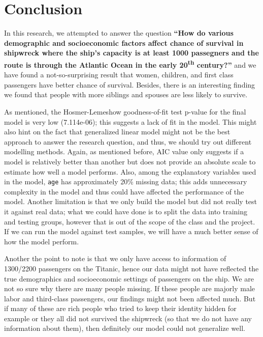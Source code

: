 \documentclass[12pt, oneside]{book}
\theoremstyle{definition}
\theoremstyle{definition}
\theoremstyle{definition}
\theoremstyle{remark}
\begin{document}
\hypertarget{conclusion}{%
\chapter{Conclusion}\label{conclusion}}

In this research, we attempted to answer the question \textbf{``How do
various demographic and socioeconomic factors affect chance of survival
in shipwreck where the ship's capacity is at least 1000 passegners and
the route is through the Atlantic Ocean in the early
20\textsuperscript{th} century?''} and we have found a not-so-surprising
result that women, children, and first class passengers have better
chance of survival. Besides, there is an interesting finding we found
that people with more siblings and spouses are less likely to survive.

As mentioned, the Hosmer-Lemeshow goodness-of-fit test p-value for the
final model is very low (7.114e-06); this suggests a lack of fit in the
model. This might also hint on the fact that generalized linear model
might not be the best approach to answer the research question, and
thus, we should try out different modelling methods. Again, as mentioned
before, AIC value only suggests if a model is relatively better than
another but does not provide an absolute scale to estimate how well a
model performs. Also, among the explanatory variables used in the model,
\texttt{age} has approximately 20\% missing data; this adds unnecessary
complexity in the model and thus could have affected the performance of
the model. Another limitation is that we only build the model but did
not really test it against real data; what we could have done is to
split the data into training and testing groups, however that is out of
the scope of the class and the project. If we can run the model against
test samples, we will have a much better sense of how the model perform.

Another the point to note is that we only have access to information of
1300/2200 passengers on the Titanic, hence our data might not have
reflected the true demographics and socioeconomic settings of passengers
on the ship. We are not so sure why there are many people missing. If
these people are majorly male labor and third-class passengers, our
findings might not been affected much. But if many of these are rich
people who tried to keep their identity hidden for example or they all
did not survived the shipwreck (so that we do not have any information
about them), then definitely our model could not generalize well.
\end{document}
